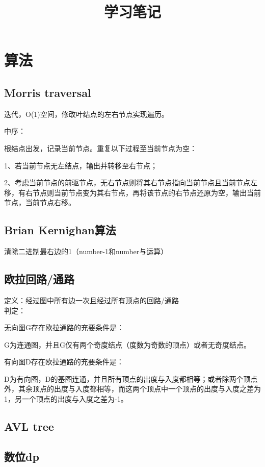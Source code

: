 \documentclass[cn,hazy,blue,screen,14pt]{template}
\title{学习笔记}
\author{}
\date{\zhtoday}
\begin{document}
\maketitle
\newpage
\tableofcontents
\newpage

\section{算法}
\subsection{Morris traversal}

迭代，O(1)空间，修改叶结点的左右节点实现遍历。

中序：

根结点出发，记录当前节点。重复以下过程至当前节点为空：

1、若当前节点无左结点，输出并转移至右节点；

2、考虑当前节点的前驱节点，无右节点则将其右节点指向当前节点且当前节点左移，有右节点则当前节点变为其右节点，再将该节点的右节点还原为空，输出当前节点，当前节点右移。

\subsection{Brian Kernighan算法}
清除二进制最右边的1（number-1和number与运算）

\subsection{欧拉回路/通路}
定义：经过图中所有边一次且经过所有顶点的回路/通路\\

判定：

无向图G存在欧拉通路的充要条件是：

G为连通图，并且G仅有两个奇度结点（度数为奇数的顶点）或者无奇度结点。

有向图D存在欧拉通路的充要条件是：

D为有向图，D的基图连通，并且所有顶点的出度与入度都相等；或者除两个顶点外，其余顶点的出度与入度都相等，而这两个顶点中一个顶点的出度与入度之差为1，另一个顶点的出度与入度之差为-1。

\subsection{AVL tree}
\subsection{数位dp}
\end{document}
